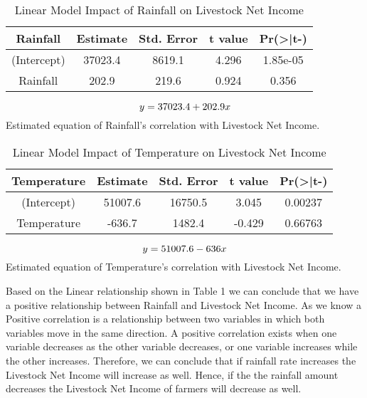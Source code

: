 \documentclass[12pt, a4]{article}
\begin{document}
\vspace{0.5\baselineskip}

\begin{table}[h]
\centering
\caption{Linear Model Impact of Rainfall on Livestock Net Income }
\label{tab:my-table}
\begin{tabular}{ccccc}
Rainfall    & Estimate & Std. Error & t value & Pr(\textgreater{}|t-) \\ \hline
(Intercept) & 37023.4  & 8619.1     & 4.296   & 1.85e-05              \\ \cline{1-1}
Rainfall    & 202.9    & 219.6      & 0.924   & 0.356                 \\ \hline
\end{tabular}

\[\large y=37023.4+202.9x\]
Estimated equation of Rainfall's correlation with Livestock Net Income.
\end{table}

\begin{table}[h]
\caption{Linear Model Impact of Temperature on Livestock Net Income }
\centering
\label{tab:my-table}
\begin{tabular}{ccccc}
Temperature & Estimate & Std. Error & t value & Pr(\textgreater{}|t-) \\ \hline
(Intercept) & 51007.6  & 16750.5    & 3.045   & 0.00237               \\ \cline{1-1}
Temperature & -636.7   & 1482.4     & -0.429  & 0.66763               \\ \hline
\end{tabular}

\[\large y=51007.6-636x\]
Estimated equation of Temperature's correlation with Livestock Net Income.
\end{table}

\vspace{0.5\baselineskip}

Based on the Linear relationship shown in Table 1 we can conclude that we have a positive relationship between Rainfall and Livestock Net Income. As we know  a Positive correlation is a relationship between two variables in which both variables move in the same direction. A positive correlation exists when one variable decreases as the other variable decreases, or one variable increases while the other increases.
Therefore, we can conclude that if rainfall rate increases the Livestock Net Income will increase as well. Hence, if the the rainfall amount decreases the Livestock Net Income of farmers will decrease as well.
\end{document}
